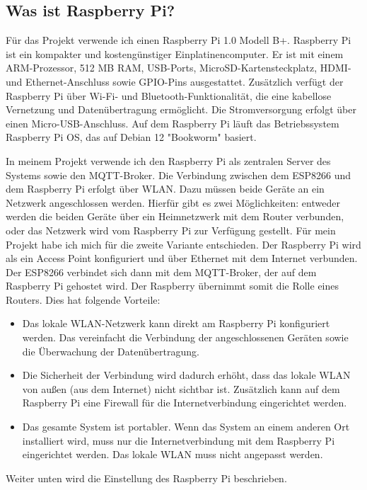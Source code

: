\documentclass[12pt, letterpaper]{article}
\begin{document}
\subsection[Überblick]{Was ist Raspberry Pi?}
\par Für das Projekt verwende ich einen Raspberry Pi 1.0 Modell B+. Raspberry Pi ist ein kompakter und kostengünstiger Einplatinencomputer. Er ist mit einem ARM-Prozessor, 512 MB RAM, USB-Ports, MicroSD-Kartensteckplatz, HDMI- und Ethernet-Anschluss sowie GPIO-Pins ausgestattet. Zusätzlich verfügt der Raspberry Pi über Wi-Fi- und Bluetooth-Funktionalität, die eine kabellose Vernetzung und Datenübertragung ermöglicht. Die Stromversorgung erfolgt über einen Micro-USB-Anschluss. Auf dem Raspberry Pi läuft das Betriebssystem Raspberry Pi OS, das auf Debian 12 "Bookworm" basiert. 
\par In meinem Projekt verwende ich den Raspberry Pi als zentralen Server des Systems sowie den MQTT-Broker. Die Verbindung zwischen dem ESP8266 und dem Raspberry Pi erfolgt über WLAN. Dazu müssen beide Geräte an ein Netzwerk angeschlossen werden. Hierfür gibt es zwei Möglichkeiten: entweder werden die beiden Geräte über ein Heimnetzwerk mit dem Router verbunden, oder das Netzwerk wird vom Raspberry Pi zur Verfügung gestellt. Für mein Projekt habe ich mich für die zweite Variante entschieden. Der Raspberry Pi wird als ein Access Point konfiguriert und über Ethernet mit dem Internet verbunden. Der ESP8266 verbindet sich dann mit dem MQTT-Broker, der auf dem Raspberry Pi gehostet wird. Der Raspberry übernimmt somit die Rolle eines Routers. Dies hat folgende Vorteile:
\begin{itemize}
  \item Das lokale WLAN-Netzwerk kann direkt am Raspberry Pi konfiguriert werden. Das vereinfacht die Verbindung der angeschlossenen Geräten sowie die Überwachung der Datenübertragung.
  \item Die Sicherheit der Verbindung wird dadurch erhöht, dass das lokale WLAN von außen (aus dem Internet) nicht sichtbar ist. Zusätzlich kann auf dem Raspberry Pi eine Firewall für die Internetverbindung eingerichtet werden.
  \item Das gesamte System ist portabler. Wenn das System an einem anderen Ort installiert wird, muss nur die Internetverbindung mit dem Raspberry Pi eingerichtet werden. Das lokale WLAN muss nicht angepasst werden.
\end{itemize}
\par Weiter unten wird die Einstellung des Raspberry Pi beschrieben.
\end{document}
